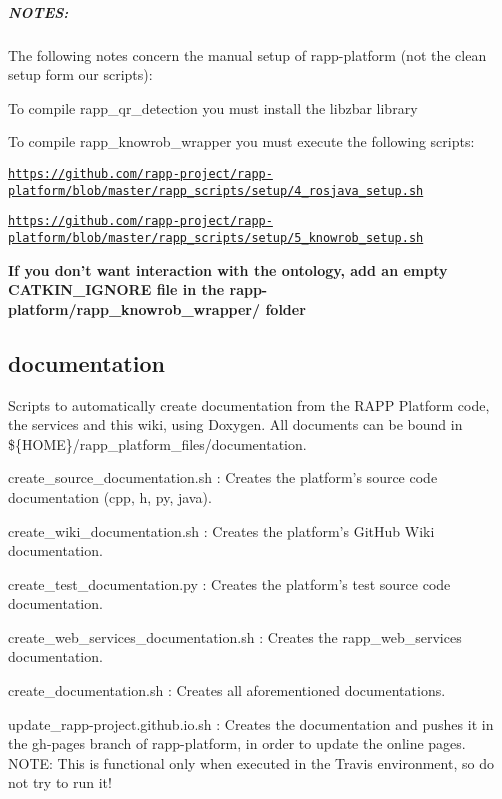 \subparagraph*{N\-O\-T\-E\-S\-:}

The following notes concern the manual setup of rapp-\/platform (not the clean setup form our scripts)\-:


\begin{DoxyItemize}
\item To compile {\ttfamily rapp\-\_\-qr\-\_\-detection} you must install the {\ttfamily libzbar} library
\item To compile {\ttfamily rapp\-\_\-knowrob\-\_\-wrapper} you must execute the following scripts\-:
\begin{DoxyItemize}
\item \href{https://github.com/rapp-project/rapp-platform/blob/master/rapp_scripts/setup/4_rosjava_setup.sh}{\tt https\-://github.\-com/rapp-\/project/rapp-\/platform/blob/master/rapp\-\_\-scripts/setup/4\-\_\-rosjava\-\_\-setup.\-sh}
\item \href{https://github.com/rapp-project/rapp-platform/blob/master/rapp_scripts/setup/5_knowrob_setup.sh}{\tt https\-://github.\-com/rapp-\/project/rapp-\/platform/blob/master/rapp\-\_\-scripts/setup/5\-\_\-knowrob\-\_\-setup.\-sh}
\item {\bfseries If you don't want interaction with the ontology, add an empty {\ttfamily C\-A\-T\-K\-I\-N\-\_\-\-I\-G\-N\-O\-R\-E} file in the {\ttfamily rapp-\/platform/rapp\-\_\-knowrob\-\_\-wrapper/} folder}
\end{DoxyItemize}
\end{DoxyItemize}

\subsection*{documentation}

Scripts to automatically create documentation from the R\-A\-P\-P Platform code, the services and this wiki, using Doxygen. All documents can be bound in {\ttfamily \$\{H\-O\-M\-E\}/rapp\-\_\-platform\-\_\-files/documentation}.


\begin{DoxyItemize}
\item {\ttfamily create\-\_\-source\-\_\-documentation.\-sh} \-: Creates the platform's source code documentation (cpp, h, py, java).
\item {\ttfamily create\-\_\-wiki\-\_\-documentation.\-sh} \-: Creates the platform's Git\-Hub Wiki documentation.
\item {\ttfamily create\-\_\-test\-\_\-documentation.\-py} \-: Creates the platform's test source code documentation.
\item {\ttfamily create\-\_\-web\-\_\-services\-\_\-documentation.\-sh} \-: Creates the rapp\-\_\-web\-\_\-services documentation.
\item {\ttfamily create\-\_\-documentation.\-sh} \-: Creates all aforementioned documentations.
\item {\ttfamily update\-\_\-rapp-\/project.\-github.\-io.\-sh} \-: Creates the documentation and pushes it in the {\ttfamily gh-\/pages} branch of rapp-\/platform, in order to update the online pages. N\-O\-T\-E\-: This is functional only when executed in the Travis environment, so do not try to run it!
\end{DoxyItemize}

